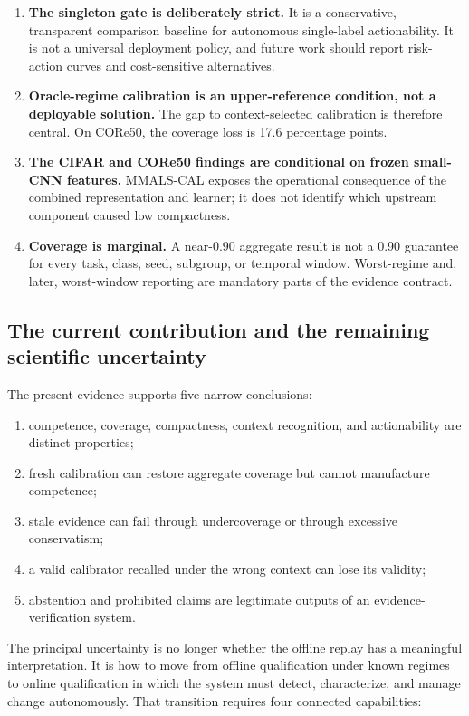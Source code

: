 \begin{enumerate}[leftmargin=*]
\item \textbf{The singleton gate is deliberately strict.} It is a conservative, transparent comparison baseline for autonomous single-label actionability. It is not a universal deployment policy, and future work should report risk-action curves and cost-sensitive alternatives.
\item \textbf{Oracle-regime calibration is an upper-reference condition, not a deployable solution.} The gap to context-selected calibration is therefore central. On CORe50, the coverage loss is 17.6 percentage points.
\item \textbf{The CIFAR and CORe50 findings are conditional on frozen small-CNN features.} MMALS-CAL exposes the operational consequence of the combined representation and learner; it does not identify which upstream component caused low compactness.
\item \textbf{Coverage is marginal.} A near-0.90 aggregate result is not a 0.90 guarantee for every task, class, seed, subgroup, or temporal window. Worst-regime and, later, worst-window reporting are mandatory parts of the evidence contract.
\end{enumerate}

\subsection{The current contribution and the remaining scientific uncertainty}

The present evidence supports five narrow conclusions:

\begin{enumerate}[leftmargin=*]
\item competence, coverage, compactness, context recognition, and actionability are distinct properties;
\item fresh calibration can restore aggregate coverage but cannot manufacture competence;
\item stale evidence can fail through undercoverage or through excessive conservatism;
\item a valid calibrator recalled under the wrong context can lose its validity;
\item abstention and prohibited claims are legitimate outputs of an evidence-verification system.
\end{enumerate}

The principal uncertainty is no longer whether the offline replay has a meaningful interpretation. It is how to move from offline qualification under known regimes to online qualification in which the system must detect, characterize, and manage change autonomously. That transition requires four connected capabilities:

